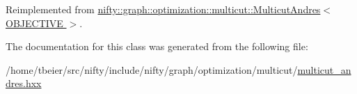 Reimplemented from \hyperlink{classnifty_1_1graph_1_1optimization_1_1multicut_1_1MulticutAndres_a476f4451db459f72c3f007387a65da8f}{nifty\+::graph\+::optimization\+::multicut\+::\+Multicut\+Andres$<$ O\+B\+J\+E\+C\+T\+I\+V\+E $>$}.



The documentation for this class was generated from the following file\+:\begin{DoxyCompactItemize}
\item 
/home/tbeier/src/nifty/include/nifty/graph/optimization/multicut/\hyperlink{multicut__andres_8hxx}{multicut\+\_\+andres.\+hxx}\end{DoxyCompactItemize}
